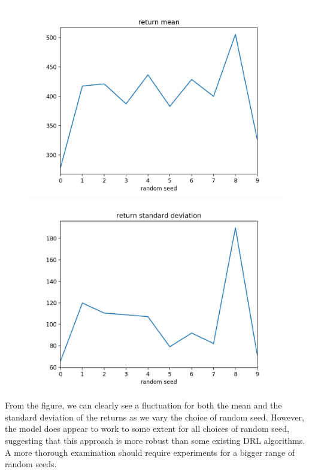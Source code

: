 \documentclass[a4paper]{article}
\theoremstyle{definition}
\begin{document}
\begin{figure}[H]
\centering
\begin{minipage}{.5\textwidth}
  \centering
  \includegraphics[width=0.95\linewidth]{return_mean.png}
\end{minipage}%
\hfill
\begin{minipage}{.5\textwidth}
  \centering
\includegraphics[width=0.95\linewidth]{return_std.png}
\end{minipage}
\end{figure}

From the figure, we can clearly see a fluctuation for both the mean and the standard deviation of the returns as we vary the choice of random seed. However, the model does appear to work to some extent for all choices of random seed, suggesting that this approach is more robust than some existing DRL algorithms. A more thorough examination should require experiments for a bigger range of random seeds.
\end{document}
